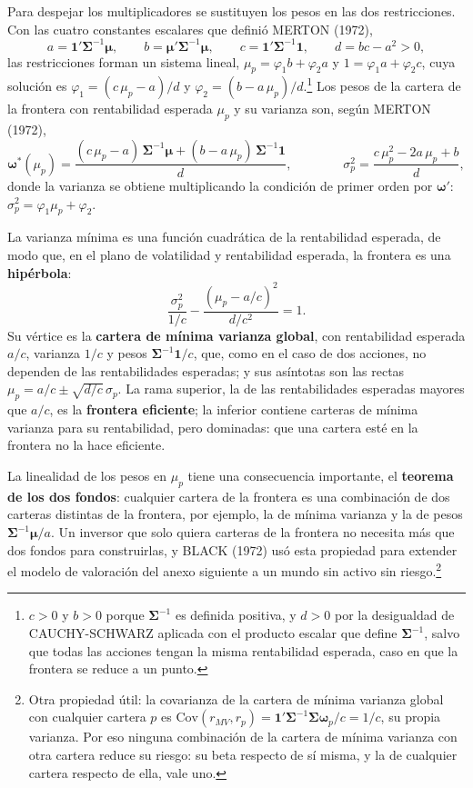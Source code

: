 \documentclass[10pt,a4paper]{article}
\newcounter{anexo}
\begin{document}
Para despejar los multiplicadores se sustituyen los pesos en las dos restricciones. Con las cuatro constantes escalares que definió MERTON (1972),
$$a=\mathbf 1'\boldsymbol\Sigma^{-1}\boldsymbol\mu,\qquad b=\boldsymbol\mu'\boldsymbol\Sigma^{-1}\boldsymbol\mu,\qquad c=\mathbf 1'\boldsymbol\Sigma^{-1}\mathbf 1,\qquad d=bc-a^2>0,$$
las restricciones forman un sistema lineal, $\mu_p=\varphi_1b+\varphi_2a$ y $1=\varphi_1a+\varphi_2c$, cuya solución es $\varphi_1=(c\,\mu_p-a)/d$ y $\varphi_2=(b-a\,\mu_p)/d$.\footnote{%
    $c>0$ y $b>0$ porque $\boldsymbol\Sigma^{-1}$ es definida positiva, y $d>0$ por la desigualdad de CAUCHY-SCHWARZ aplicada con el producto escalar que define $\boldsymbol\Sigma^{-1}$, salvo que todas las acciones tengan la misma rentabilidad esperada, caso en que la frontera se reduce a un punto.
} Los pesos de la cartera de la frontera con rentabilidad esperada $\mu_p$ y su varianza son, según MERTON (1972),
$$\boldsymbol\omega^*(\mu_p)=\frac{(c\,\mu_p-a)\,\boldsymbol\Sigma^{-1}\boldsymbol\mu+(b-a\,\mu_p)\,\boldsymbol\Sigma^{-1}\mathbf 1}{d},\qquad\qquad \sigma_p^2=\frac{c\,\mu_p^2-2a\,\mu_p+b}{d},$$
donde la varianza se obtiene multiplicando la condición de primer orden por $\boldsymbol\omega'$: $\sigma_p^2=\varphi_1\mu_p+\varphi_2$.

La varianza mínima es una función cuadrática de la rentabilidad esperada, de modo que, en el plano de volatilidad y rentabilidad esperada, la frontera es una \textbf{hipérbola}:
$$\frac{\sigma_p^2}{1/c}-\frac{(\mu_p-a/c)^2}{d/c^2}=1.$$
Su vértice es la \textbf{cartera de mínima varianza global}, con rentabilidad esperada $a/c$, varianza $1/c$ y pesos $\boldsymbol\Sigma^{-1}\mathbf 1/c$, que, como en el caso de dos acciones, no dependen de las rentabilidades esperadas; y sus asíntotas son las rectas $\mu_p=a/c\pm\sqrt{d/c}\,\sigma_p$. La rama superior, la de las rentabilidades esperadas mayores que $a/c$, es la \textbf{frontera eficiente}; la inferior contiene carteras de mínima varianza para su rentabilidad, pero dominadas: que una cartera esté en la frontera no la hace eficiente.

La linealidad de los pesos en $\mu_p$ tiene una consecuencia importante, el \textbf{teorema de los dos fondos}: cualquier cartera de la frontera es una combinación de dos carteras distintas de la frontera, por ejemplo, la de mínima varianza y la de pesos $\boldsymbol\Sigma^{-1}\boldsymbol\mu/a$. Un inversor que solo quiera carteras de la frontera no necesita más que dos fondos para construirlas, y BLACK (1972) usó esta propiedad para extender el modelo de valoración del anexo siguiente a un mundo sin activo sin riesgo.\footnote{%
    Otra propiedad útil: la covarianza de la cartera de mínima varianza global con cualquier cartera $p$ es $\mathrm{Cov}(r_{MV},r_p)=\mathbf 1'\boldsymbol\Sigma^{-1}\boldsymbol\Sigma\boldsymbol\omega_p/c=1/c$, su propia varianza. Por eso ninguna combinación de la cartera de mínima varianza con otra cartera reduce su riesgo: su beta respecto de sí misma, y la de cualquier cartera respecto de ella, vale uno.
}
\end{document}
